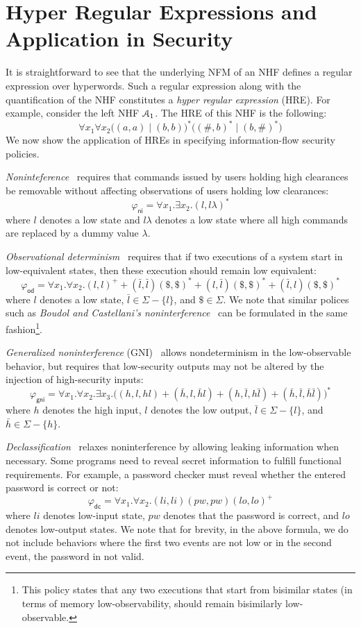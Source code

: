 \section{Hyper Regular Expressions and Application in Security}

It is straightforward to see that the underlying NFM of an NHF defines a 
regular expression over hyperwords. Such a regular expression along with the 
quantification of the NHF constitutes a {\em hyper regular expression} 
(HRE). For example, consider the left NHF $\mathcal{A}_1$. The HRE of this NHF is the 
following:
%
$$
\forall x_1\forall x_2\Big((a, a) \mid (b, b)\Big)^*\Big((\#, b)^* \mid (b, 
\#)^* \Big)
$$
%
We now show the application of HREs in specifying information-flow 
security policies.

{\em Noninteference}~\cite{gm82} requires that commands issued by users holding 
high clearances be removable without affecting observations of users holding 
low clearances:
%
$$
\varphi_{\mathsf{ni}} = \forall x_1.\exists x_2.(l, l\lambda)^*
$$
%
where $l$ denotes a low state and $l\lambda$ denotes a low state where all high 
commands are replaced by a dummy value $\lambda$.

{\em Observational determinism}~\cite{zm03} requires that if two executions of 
a system start in low-equivalent states, then these execution should remain low 
equivalent:
%
$$
\varphi_{\mathsf{od}} = \forall x_1.\forall x_2. (l, l)^+ + (\bar{l}, 
\bar{l})(\$, \$)^* + (l, \bar{l})(\$, \$)^* + (\bar{l}, l)(\$, \$)^*
$$
%
where $l$ denotes a low state, $\bar{l} \in \Sigma - \{l\}$, and $\$ \in 
\Sigma$. We note that similar polices such as {\em Boudol and Castellani’s 
noninterference}~\cite{bd02} can be formulated in the same 
fashion\footnote{This policy states that any two executions that start from 
bisimilar states (in terms of memory low-observability, should remain 
bisimilarly low-observable.}.

{\em Generalized noninterference} (GNI)~\cite{m88} allows nondeterminism in 
the low-observable behavior, but requires that low-security outputs may 
not be altered by the injection of high-security inputs:
%
$$
\varphi_{\mathsf{gni}} = \forall x_1.\forall x_2.\exists x_3. \bigg((h, l, hl) 
+ (\bar{h}, l, \bar{h}l) + (h, \bar{l}, h\bar{l}) + (\bar{h}, \bar{l}, 
\bar{h}\bar{l}) \bigg)^*
$$
%
where $h$ denotes the high input, $l$ denotes the low output, $\bar{l} \in 
\Sigma -\{l\}$, and $\bar{h} \in \Sigma - \{h\}$.

{\em Declassification}~\cite{ss00} relaxes noninterference by allowing leaking 
information when necessary. Some programs need to reveal secret information to 
fulfill functional requirements. For example, a password checker must reveal 
whether the entered password is correct or not:
%
$$
\varphi_{\mathsf{dc}} = \forall x_1.\forall x_2. (li,li)(pw, pw)(lo, lo)^+
$$
%
where $li$ denotes low-input state, $pw$ denotes that the password is correct, 
and $lo$ denotes low-output states. We note that for brevity, in the above 
formula, we do not include behaviors where the first two events are not low or 
in the second event, the password in not valid. 


